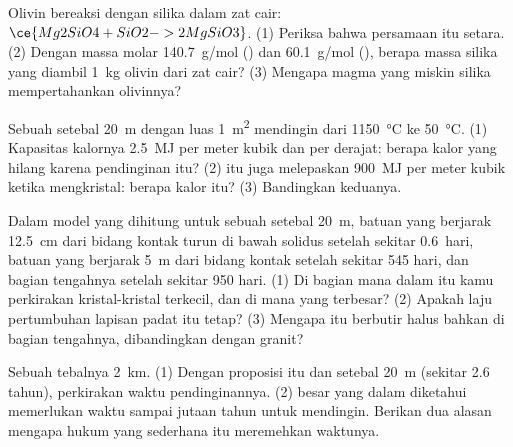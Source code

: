 \begin{exercise}[$\star\star$]\label{exo:g11:igneous-rocks:10}
Olivin bereaksi dengan silika dalam zat cair: $\ce{Mg2SiO4 + SiO2 -> 2
MgSiO3}$. (1) Periksa bahwa persamaan itu setara. (2) Dengan massa molar
\qty{140.7}{g/mol} () dan \qty{60.1}{g/mol} (), berapa
massa silika yang diambil \qty{1}{kg} olivin dari zat cair? (3) Mengapa magma
yang miskin silika mempertahankan olivinnya?
\end{exercise}

\begin{exercise}[$\star\star$]\label{exo:g11:igneous-rocks:11}
Sebuah  setebal \qty{20}{m} dengan luas \qty{1}{m^2} mendingin dari
\qty{1150}{\degreeCelsius} ke \qty{50}{\degreeCelsius}. (1) Kapasitas kalornya
\qty{2.5}{MJ} per meter kubik dan per derajat: berapa kalor yang hilang
karena pendinginan itu? (2)  itu juga melepaskan \qty{900}{MJ} per meter
kubik ketika mengkristal: berapa kalor itu? (3) Bandingkan keduanya.
\end{exercise}

\begin{exercise}[$\star\star\star$]\label{exo:g11:igneous-rocks:12}
Dalam model yang dihitung untuk sebuah  setebal \qty{20}{m}, batuan yang
berjarak \qty{12.5}{cm} dari bidang kontak turun di bawah solidus setelah
sekitar \num{0.6}~hari, batuan yang berjarak \qty{5}{m} dari bidang kontak
setelah sekitar 545 hari, dan bagian tengahnya setelah sekitar 950 hari. (1) Di
bagian mana dalam  itu kamu perkirakan kristal-kristal terkecil, dan di
mana yang terbesar? (2) Apakah laju pertumbuhan lapisan padat itu tetap?
(3) Mengapa  itu berbutir halus bahkan di bagian tengahnya, dibandingkan
dengan granit?
\end{exercise}

\begin{exercise}[$\star\star\star$]\label{exo:g11:igneous-rocks:13}
Sebuah  tebalnya \qty{2}{km}. (1) Dengan proposisi itu dan  setebal
\qty{20}{m} (sekitar 2.6 tahun), perkirakan waktu pendinginannya. (2) 
besar yang dalam diketahui memerlukan waktu sampai jutaan tahun untuk mendingin.
Berikan dua alasan mengapa hukum yang sederhana itu meremehkan waktunya.
\end{exercise}

